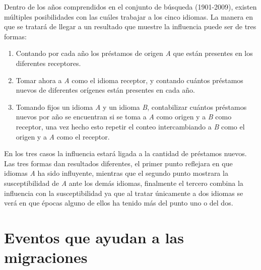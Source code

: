 Dentro de los años comprendidos en el conjunto de búsqueda
(1901-2009), existen múltiples posibilidades con las cuáles trabajar a los
cinco idiomas. La manera en que se tratará de llegar a un resultado que muestre la influencia puede ser de tres formas:
\begin{enumerate}
	
\item Contando por cada año los préstamos de origen \textit{A} que están presentes en los diferentes receptores. 

\item Tomar ahora a \textit{A}  como el idioma receptor, y contando cuántos préstamos nuevos de diferentes orígenes están presentes en cada año.  


\item Tomando fijos un idioma \textit{A} y un idioma \textit{B}, contabilizar cuántos préstamos nuevos por año se encuentran si se toma a \textit{A} como origen y a \textit{B} como receptor,  una vez hecho esto  repetir el conteo intercambiando a \textit{B} como el origen y a \textit{A} como el receptor. 

\end{enumerate}


En los tres casos la influencia estará ligada a la cantidad de préstamos
nuevos.  Las tres formas dan resultados diferentes,  el primer punto reflejara en que idiomas \textit{A} ha sido influyente, mientras que el segundo punto mostrara la susceptibilidad  de \textit{A} ante los demás idiomas,  finalmente el tercero combina la influencia con la susceptibilidad ya que al tratar únicamente a dos idiomas se verá en que épocas alguno de ellos ha tenido más del punto uno o del dos. 


\section{Eventos que ayudan a las migraciones} %

